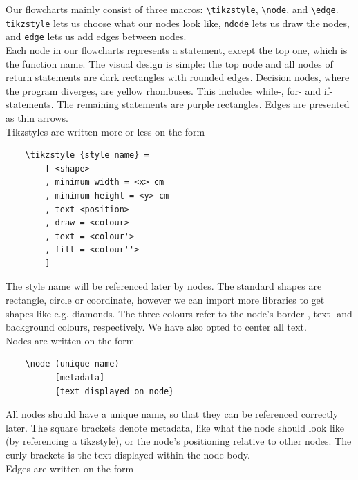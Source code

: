 
Our flowcharts mainly consist of three macros: \texttt{\textbackslash tikzstyle}, \texttt{\textbackslash node}, and \texttt{\textbackslash edge}. \texttt{tikzstyle} lets us choose what our nodes look like, \texttt{ndode} lets us draw the nodes, and \texttt{edge} lets us add edges between nodes. \hfill \\

Each node in our flowcharts represents a statement, except the top one, which is the function name. The visual design is simple: the top node and all nodes of return statements are dark rectangles with rounded edges. Decision nodes, where the program diverges, are yellow rhombuses. This includes while-, for- and if-statements. The remaining statements are purple rectangles. Edges are presented as thin arrows. \hfill \\

Tikzstyles are written more or less on the form

\begin{verbatim}
    \tikzstyle {style name} =
        [ <shape>
        , minimum width = <x> cm
        , minimum height = <y> cm
        , text <position>
        , draw = <colour>
        , text = <colour'>
        , fill = <colour''>
        ]
\end{verbatim}

The style name will be referenced later by nodes. The standard shapes are rectangle, circle or coordinate, however we can import more libraries to get shapes like e.g. diamonds. The three colours refer to the node's border-, text- and background colours, respectively. We have also opted to center all text. \hfill \\

Nodes are written on the form

\begin{verbatim}
    \node (unique name)
          [metadata]
          {text displayed on node}
\end{verbatim}

All nodes should have a unique name, so that they can be referenced correctly later. The square brackets denote metadata, like what the node should look like (by referencing a tikzstyle), or the node's positioning relative to other nodes. The curly brackets is the text displayed within the node body. \hfill \\

Edges are written on the form

